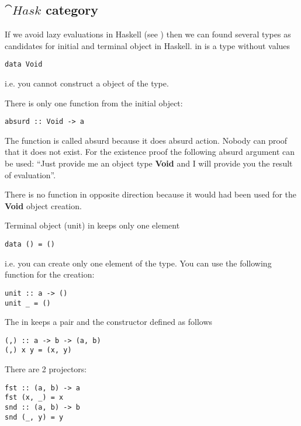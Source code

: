 \subsection{$\cat{Hask}$ category}
\begin{example}
If we avoid lazy evaluations in Haskell (see
) then we can found several types
as candidates for initial and terminal object in Haskell. 
\label{ex:hask_initial_object}
 in  is a
type without values 
\begin{verbatim}
data Void
\end{verbatim}
i.e. you cannot construct a object of the type.

There is only one function from the initial object:
\begin{verbatim}
absurd :: Void -> a
\end{verbatim}
The function is called absurd because it does absurd action. Nobody
can proof that it does not exist. For the existence proof the
following absurd argument can be used: ``Just provide me an object type
\textbf{Void} and I will provide you the result of
evaluation''.  

There is no function in opposite direction because it would had been
used for the \textbf{Void} object creation. 
\end{example}

\begin{example}
\label{ex:hask_terminal_object}
Terminal object (unit) in  keeps only one element
\begin{verbatim}
data () = ()
\end{verbatim}
i.e. you can create only one element of the type. You can use the
following function for the creation:
\begin{verbatim}
unit :: a -> ()
unit _ = ()
\end{verbatim}
\end{example}

\begin{example}
\label{ex:hask_product}
The  in  keeps a
pair and the constructor defined as follows
\begin{verbatim}
(,) :: a -> b -> (a, b)
(,) x y = (x, y)
\end{verbatim}
There are 2 projectors: 
\begin{verbatim}
fst :: (a, b) -> a
fst (x, _) = x
snd :: (a, b) -> b
snd (_, y) = y
\end{verbatim}
\end{example}

